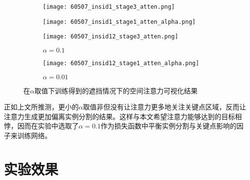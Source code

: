 \begin{figure}[ht]
	\centering
	\begin{minipage}{\linewidth}
		\centering
		\begin{subfigure}{0.3\linewidth}
			\texttt{[image: 60507\_insid1\_stage3\_atten.png]}
		\end{subfigure}
		\begin{subfigure}{0.3\linewidth}
			\texttt{[image: 60507\_insid1\_stage1\_atten\_alpha.png]}
		\end{subfigure}
		\begin{sideways}
			\begin{minipage}{1cm}
			\end{minipage}
		\end{sideways}
	\end{minipage}
	
	\vskip2pt
	\begin{minipage}{\linewidth}
		\centering
		\begin{subfigure}{0.3\linewidth}
			\texttt{[image: 60507\_insid12\_stage3\_atten.png]}
			\caption{$\alpha=0.1$}
		\end{subfigure}
		\begin{subfigure}{0.3\linewidth}
			\texttt{[image: 60507\_insid12\_stage1\_atten\_alpha.png]}
			\caption{$\alpha=0.01$}
		\end{subfigure}
		\begin{sideways}
			\begin{minipage}{1cm}
				\rightline{被遮挡人}
			\end{minipage}
		\end{sideways}
	\end{minipage}
	\caption{在$\alpha$取值下训练得到的遮挡情况下的空间注意力可视化结果}
	\label{fig:attenalpha}
\end{figure}

正如上文所推测，更小的$\alpha$取值非但没有让注意力更多地关注关键点区域，反而让注意力生成更加偏离实例分割的结果。这样与本文希望注意力能够达到的目标相悖，因而在实验中选取了$\alpha=0.1$作为损失函数中平衡实例分割与关键点影响的因子来训练网络。

\section{实验效果}
\label{sec:demo}

